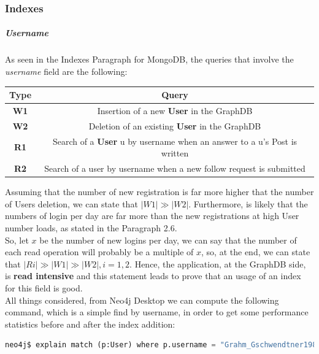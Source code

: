 \subsubsection{Indexes}
\subparagraph{Username} As seen in the Indexes Paragraph for MongoDB, the queries that involve the \textit{username} field are the following:
\begin{center}
	\begin{tabular}{|c | c |} 
		\hline
		\textbf{Type} & \textbf{Query} \\ [0.5ex] 
		\hline
		\textbf{W1} & Insertion of a new \textbf{User} in the GraphDB\\ 
		\hline
		\textbf{W2} & Deletion of an existing \textbf{User} in the GraphDB \\
		\hline
		\textbf{R1} & Search of a \textbf{User} u by username when an answer to a u's Post is written \\
		\hline
		\textbf{R2} & Search of a user by username when a new follow request is submitted \\
		\hline
	\end{tabular}
\end{center}
Assuming that the number of new registration is far more higher that the number of Users deletion, we can state that $|W1| \gg |W2|$. Furthermore, is likely that the numbers of login per day are far more than the new registrations at high User number loads, as stated in the Paragraph 2.6.\\
So, let $x$ be the number of new logins per day, we can say that the number of each read operation will probably be a multiple of $x$, so, at the end, we can state that $|Ri| \gg |W1| \gg |W2|, i = 1,2$. Hence, the application, at the GraphDB side, is \textbf{read intensive} and this statement leads to prove that an usage of an index for this field is good.\\
All things considered, from Neo4j Desktop we can compute the following command, which is a simple find by username, in order to get some performance statistics before and after the index addition:
\begin{lstlisting}[language=python]
	neo4j$ explain match (p:User) where p.username = "Grahm_Gschwendtner1989" return p
\end{lstlisting}

